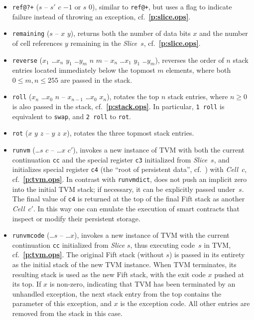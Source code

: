 \documentclass[12pt,oneside]{article}
\def\refpoint#1{{\rm\textbf{\ref{#1}}}}
\let\ptref=\refpoint
\begin{document}
\begin{itemize}
\item {\tt ref@?+} ($s$ -- $s'$ $c$ $-1$ or $s$ $0$), similar to {\tt ref@+}, but uses a flag to indicate failure instead of throwing an exception, cf.~\ptref{p:slice.ops}.
\item {\tt remaining} ($s$ -- $x$ $y$), returns both the number of data bits $x$ and the number of cell references $y$ remaining in the {\em Slice}~$s$, cf.~\ptref{p:slice.ops}.
\item {\tt reverse} ($x_1$ \dots $x_n$ $y_1$ \dots $y_m$ $n$ $m$ -- $x_n$ \dots $x_1$ $y_1$ \dots $y_m$), reverses the order of $n$ stack entries located immediately below the topmost $m$ elements, where both $0\leq m,n\leq 255$ are passed in the stack.
\item {\tt roll} ($x_n$ \dots $x_0$ $n$ -- $x_{n-1}$ \dots $x_0$ $x_n$), rotates the top $n$ stack entries, where $n\geq0$ is also passed in the stack, cf.~\ptref{p:stack.ops}. In particular, {\tt 1 roll} is equivalent to {\tt swap}, and {\tt 2 roll} to {\tt rot}.
\item {\tt rot} ($x$ $y$ $z$ -- $y$ $z$ $x$), rotates the three topmost stack entries.
\item {\tt runvm} (\dots $s$ $c$ -- \dots $x$ $c'$), invokes a new instance of TVM with both the current continuation {\tt cc} and the special register {\tt c3} initialized from {\em Slice\/}~$s$, and initializes special register {\tt c4} (the ``root of persistent data'', cf.~\cite[1.4]{TVM}) with {\em Cell\/}~$c$, cf.~\ptref{p:tvm.ops}. In contrast with {\tt runvmdict}, does not push an implicit zero into the initial TVM stack; if necessary, it can be explicitly passed under~$s$. The final value of {\tt c4} is returned at the top of the final Fift stack as another {\em Cell\/}~$c'$. In this way one can emulate the execution of smart contracts that inspect or modify their persistent storage.
\item {\tt runvmcode} (\dots $s$ -- \dots $x$), invokes a new instance of TVM with the current continuation {\tt cc} initialized from {\em Slice\/} $s$, thus executing code~$s$ in TVM, cf.~\ptref{p:tvm.ops}. The original Fift stack (without $s$) is passed in its entirety as the initial stack of the new TVM instance. When TVM terminates, its resulting stack is used as the new Fift stack, with the exit code $x$ pushed at its top. If $x$ is non-zero, indicating that TVM has been terminated by an unhandled exception, the next stack entry from the top contains the parameter of this exception, and $x$ is the exception code. All other entries are removed from the stack in this case.

\end{itemize}
\end{document}

